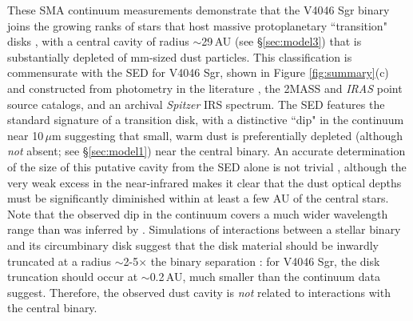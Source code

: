 {These SMA continuum measurements demonstrate that the V4046 Sgr binary joins 
the growing ranks of stars that host massive protoplanetary ``transition" disks 
\citep[e.g.,][]{andrews11}, with a central cavity of radius $\sim$29\,AU (see 
\S \ref{sec:model3}) that is substantially depleted of mm-sized dust particles. 
This classification is commensurate with the SED for V4046 Sgr, shown in Figure 
\ref{fig:summary}(c) and constructed from photometry in the literature 
\citep{hutchinson90,weaver92,jensen96,jensen97,rodriguez10,oberg11}, the 2MASS 
\citep{skrutskie06} and {\it IRAS} \citep{beichmann88} point source catalogs, 
and an archival {\it Spitzer} IRS spectrum.  The SED features the standard 
signature of a transition disk, with a distinctive ``dip" in the continuum near 
10\,$\mu$m suggesting that small, warm dust is preferentially depleted (although
{\it not} absent; see \S\ref{sec:model1}) near the central binary.  An accurate 
determination of the size of this putative cavity from the SED alone is not 
trivial \citep[e.g.,][]{calvet02}, although the very weak excess in the 
near-infrared makes it clear that the dust optical depths must be significantly 
diminished within at least a few AU of the central stars.  Note that the 
observed dip in the continuum covers a much wider wavelength range than was 
inferred by \citet{jensen97}.  Simulations of interactions between a stellar 
binary and its circumbinary disk suggest that the disk material should be 
inwardly truncated at a radius $\sim$2-5$\times$ the binary separation 
\citep[e.g.,][]{artymowicz94}: for V4046 Sgr, the disk truncation should occur 
at $\sim$0.2\,AU, much smaller than the continuum data suggest.  Therefore, the 
observed dust cavity is {\it not} related to interactions with the central 
binary.

}
